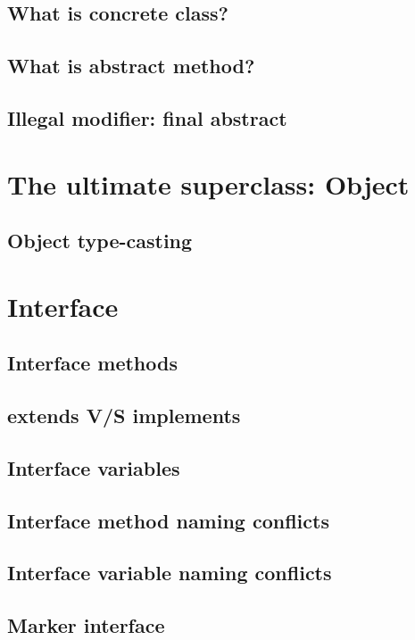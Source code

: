 \documentclass[14pt,fleqn]{extbook} %
\begin{document}
\subsection{What is concrete class?}

\subsection{What is abstract method?}

\subsection{Illegal modifier: final abstract}

\section{The ultimate superclass: Object}

\subsection{Object type-casting}

\section{Interface}

\subsection{Interface methods}

\subsection{extends V/S implements}

\subsection{Interface variables}

\subsection{Interface method naming conflicts}

\subsection{Interface variable naming conflicts}

\subsection{Marker interface}

\end{document}
